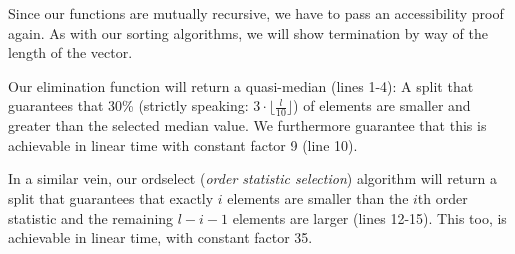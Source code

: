 Since our functions are mutually recursive, we have to pass an accessibility proof again. As with our sorting algorithms, we will show termination by way of the length of the vector.

Our elimination function will return a quasi-median (lines 1-4): A split that guarantees that 30\% (strictly speaking: $3 \cdot \lfloor \frac l {10}\rfloor$) of elements are smaller and greater than the selected median value. We furthermore guarantee that this is achievable in linear time with constant factor 9 (line 10).

In a similar vein, our ordselect (\emph{order statistic selection}) algorithm will return a split that guarantees that exactly $i$ elements are smaller than the $i$th order statistic and the remaining $l - i - 1$ elements are larger (lines 12-15). This too, is achievable in linear time, with constant factor 35.

